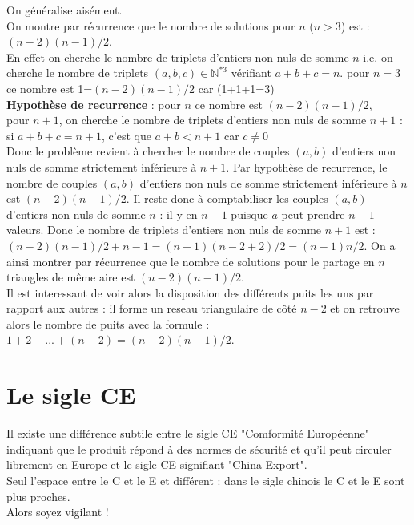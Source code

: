 \documentclass[a4paper,11pt]{book}
\begin{document}
On g\'en\'eralise ais\'ement.\\
On montre par r\'ecurrence que le nombre de solutions pour $n$ ($n>3$) est : 
$(n-2)(n-1)/2$.\\
En effet on cherche le nombre de triplets d'entiers non nuls de somme $n$ i.e.
on cherche le nombre de triplets $(a,b,c)\in \mathbb N^{*3}$ v\'erifiant 
$a+b+c=n$.
pour $n=3$ ce nombre est 1=$(n-2)(n-1)/2$ car (1+1+1=3)\\
{\bf Hypoth\`ese de recurrence} : pour $n$ ce nombre est $(n-2)(n-1)/2$, \\
pour $n+1$, on cherche le nombre de 
triplets d'entiers non nuls de somme $n+1$ :\\
si $a+b+c=n+1$, c'est que $a+b<n+1$ car $c \neq 0$\\
Donc le probl\`eme revient \`a chercher le nombre de couples $(a,b)$ d'entiers 
non nuls de somme strictement inf\'erieure \`a $n+1$. Par hypoth\`ese de 
recurrence, le nombre de couples $(a,b)$ d'entiers 
non nuls de somme strictement inf\'erieure \`a $n$ est $(n-2)(n-1)/2$. Il reste
donc \`a comptabiliser les couples $(a,b)$ d'entiers 
non nuls de somme $n$ : il y en $n-1$ puisque $a$ peut prendre $n-1$ valeurs. 
Donc le nombre de triplets d'entiers non nuls de somme $n+1$ est :\\
$(n-2)(n-1)/2+n-1=(n-1)(n-2+2)/2=(n-1)n/2$.
On a ainsi montrer par r\'ecurrence que le nombre de solutions pour le partage
en $n$ triangles de m\^eme aire est $(n-2)(n-1)/2$.\\
Il est interessant de voir alors la disposition des diff\'erents puits les uns 
par rapport aux autres : il forme un reseau triangulaire de c\^ot\'e $n-2$
et on retrouve alors le nombre de puits avec la formule :\\
$1+2+...+(n-2)=(n-2)(n-1)/2$.
\section{Le sigle CE}
Il existe une diff\'erence subtile entre le sigle CE "Comformit\'e Europ\'eenne"
indiquant que le produit r\'epond \`a des normes de s\'ecurit\'e et qu'il peut 
circuler librement en Europe et le sigle CE signifiant "China Export".\\
Seul l'espace entre le C et le E et diff\'erent : dans le sigle chinois le C et
le E sont plus proches.\\
Alors  soyez vigilant !
\end{document}

